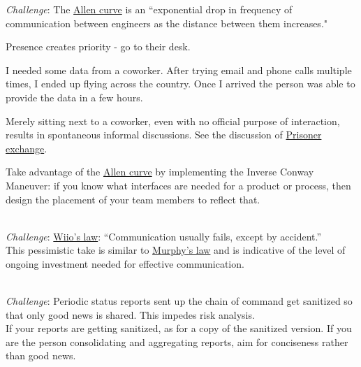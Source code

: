 \textit{Challenge}: The \href{https://en.wikipedia.org/wiki/Allen_curve}{Allen curve} 
is 
an ``exponential drop in frequency of communication between engineers as the distance between them increases."

Presence creates priority - go to their desk. 
\begin{mdframed}
I needed some data from a coworker. After trying email and phone calls multiple times, I ended up flying across the country. Once I arrived the person was able to provide the data in a few hours.
\end{mdframed}

Merely sitting next to a coworker, even with no official purpose of interaction, results in spontaneous informal discussions. See the discussion of 
\hyperref[sec:prisoner-exchange]{Prisoner exchange}.

Take advantage of the \href{https://en.wikipedia.org/wiki/Allen_curve}{Allen curve} 
by implementing the Inverse Conway Maneuver: if you know what interfaces are needed for a product or process, then design the placement of your team members to reflect that.

\ \\
\textit{Challenge}: \href{https://en.wikipedia.org/wiki/Wiio\%27s_laws}{Wiio's law}: 
``Communication usually fails, except by accident.''\\
This pessimistic take is similar to \href{https://en.wikipedia.org/wiki/Murphy\%27s_law}{Murphy's law}
and is indicative of the level of ongoing investment needed for effective communication. 

\ \\
\textit{Challenge}: Periodic status reports sent up the chain of command get sanitized so that only good news is shared. This impedes risk analysis. \\
If your reports are getting sanitized, as for a copy of the sanitized version. If you are the person consolidating and aggregating reports, aim for conciseness rather than good news. 


